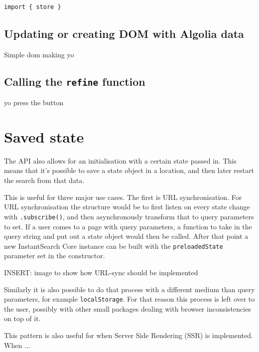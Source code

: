 \begin{lstlisting}[caption={Registering a refinement},label={lst:registering-refinement}]
import { store } 
\end{lstlisting}

\subsection{Updating or creating DOM with Algolia data}
\label{subs:data_to_dom}

Simple dom making yo %

\subsection{Calling the {\tt refine} function}
\label{subs:refining}

yo press the button %


\section{Saved state} %
\label{sec:saved_state}

The API also allows for an initialisation with a certain state passed in. This means that it's possible to save a state object in a location, and then later restart the search from that data. 

This is useful for three major use cases. The first is URL synchronisation. For URL synchronisation the structure would be to first listen on every state change with {\tt .subscribe()}, and then asynchronously transform that to query parameters to set. If a user comes to a page with query parameters, a function to take in the query string and put out a state object would then be called. After that point a new InstantSearch Core instance can be built with the {\tt preloadedState} parameter set in the constructor.

INSERT: image to show how URL-sync should be implemented %

Similarly it is also possible to do that process with a different medium than query parameters, for example {\tt localStorage}. For that reason this process is left over to the user, possibly with other small packages dealing with browser inconsistencies on top of it. 

This pattern is also useful for when Server Side Rendering (SSR) is implemented. When ...%

